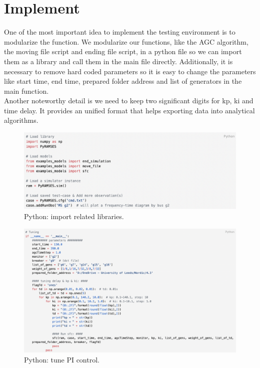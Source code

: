 \section{Implement} %
One of the most important idea to implement the testing environment is to modularize the function. We modularize our functions, like the AGC algorithm, the moving file script and ending file script, in a python file so we can import them as a library and call them in the main file directly. Additionally, it is necessary to remove hard coded parameters so it is easy to change the parameters like start time, end time, prepared folder address and list of generators in the main function.\\

Another noteworthy detail is we need to keep two significant digits for kp, ki and time delay. It provides an unified format that helps exporting data into analytical algorithms.\\

\begin{figure}[htbp]
\centering
\includegraphics[width = \textwidth]{figure/4_3_code1.png}
\caption{Python: import related libraries.}
\label{4_3_code1}
\end{figure}

\begin{figure}[htbp]
\centering
\includegraphics[width = \textwidth]{figure/4_3_code2.png}
\caption{Python: tune PI control.}
\label{4_3_code2}
\end{figure}